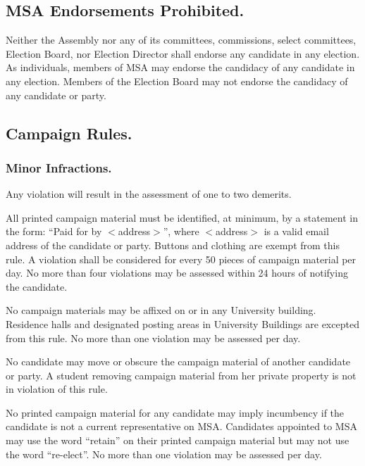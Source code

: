 \subsection{MSA Endorsements Prohibited.}
Neither the Assembly nor any of its committees, commissions, select committees, Election Board, nor Election Director shall endorse any candidate in any election.  As individuals, members of MSA may endorse the candidacy of any candidate in any election.  Members of the Election Board may not endorse the candidacy of any candidate or party.

\subsection{Campaign Rules.}

\subsubsection{Minor Infractions.}
Any violation will result in the assessment of one to two demerits.

All printed campaign material must be identified, at minimum, by a statement in the form: ``Paid for by $<$address$>$'', where $<$address$>$ is a valid email address of the candidate or party.  Buttons and clothing are exempt from this rule.  A violation shall be considered for every 50 pieces of campaign material per day.  No more than four violations may be assessed within 24 hours of notifying the candidate.

No campaign materials may be affixed on or in any University building.  Residence halls and designated posting areas in University Buildings are excepted from this rule. No more than one violation may be assessed per day.

No candidate may move or obscure the campaign material of another candidate or party.  A student removing campaign material from her private property is not in violation of this rule.

No printed campaign material for any candidate may imply incumbency if the candidate is not a current representative on MSA.  Candidates appointed to MSA may use the word ``retain'' on their printed campaign material but may not use the word ``re-elect''.  No more than one violation may be assessed per day.

